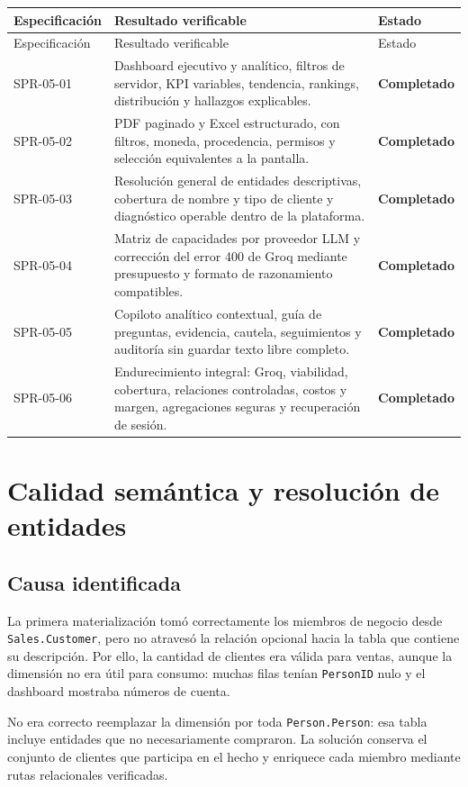 \documentclass[11pt,letterpaper]{article}
\newcommand{\file}[1]{\texttt{#1}}
\newcommand{\ok}{\textcolor{success}{\textbf{Completado}}}
\begin{document}
\begin{longtable}{@{}p{}p{}p{}@{}}
  \toprule
  Especificación & Resultado verificable & Estado \\
  \midrule
  \endfirsthead
  \toprule
  Especificación & Resultado verificable & Estado \\
  \midrule
  \endhead
  SPR-05-01 & Dashboard ejecutivo y analítico, filtros de servidor, KPI variables, tendencia, rankings, distribución y hallazgos explicables. & \ok \\
  SPR-05-02 & PDF paginado y Excel estructurado, con filtros, moneda, procedencia, permisos y selección equivalentes a la pantalla. & \ok \\
  SPR-05-03 & Resolución general de entidades descriptivas, cobertura de nombre y tipo de cliente y diagnóstico operable dentro de la plataforma. & \ok \\
  SPR-05-04 & Matriz de capacidades por proveedor LLM y corrección del error 400 de Groq mediante presupuesto y formato de razonamiento compatibles. & \ok \\
  SPR-05-05 & Copiloto analítico contextual, guía de preguntas, evidencia, cautela, seguimientos y auditoría sin guardar texto libre completo. & \ok \\
  SPR-05-06 & Endurecimiento integral: Groq, viabilidad, cobertura, relaciones controladas, costos y margen, agregaciones seguras y recuperación de sesión. & \ok \\
  \bottomrule
\end{longtable}

\section{Calidad semántica y resolución de entidades}

\subsection{Causa identificada}

La primera materialización tomó correctamente los miembros de negocio desde \file{Sales.Customer}, pero no atravesó la relación opcional hacia la tabla que contiene su descripción. Por ello, la cantidad de clientes era válida para ventas, aunque la dimensión no era útil para consumo: muchas filas tenían \file{PersonID} nulo y el dashboard mostraba números de cuenta.

No era correcto reemplazar la dimensión por toda \file{Person.Person}: esa tabla incluye entidades que no necesariamente compraron. La solución conserva el conjunto de clientes que participa en el hecho y enriquece cada miembro mediante rutas relacionales verificadas.
\end{document}
